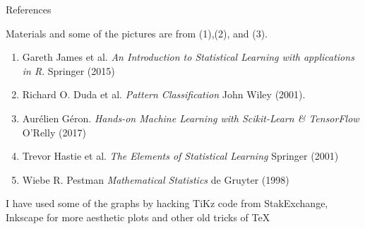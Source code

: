 \documentclass{beamer}
\begin{document}
\begin{frame}{References}
	
	Materials and some of the pictures are from (1),(2), and (3).
	\begin{enumerate}
		\item Gareth James et al. {\it An Introduction to Statistical Learning with applications in R}. Springer (2015)
		\item Richard O. Duda et al. {\it Pattern Classification} John Wiley (2001). 
		\item Aur\'elien G\'eron. {\it Hands-on Machine Learning with Scikit-Learn \& TensorFlow} O'Relly (2017)
		\item Trevor Hastie et al. {\it The Elements of Statistical Learning} Springer (2001)
		\item Wiebe R. Pestman {\it Mathematical Statistics} de Gruyter (1998)
	\end{enumerate}	
	
	I have used some of the graphs by hacking TiKz code from StakExchange, Inkscape for more aesthetic plots and other old tricks of \TeX
\end{frame}	
\end{document}
